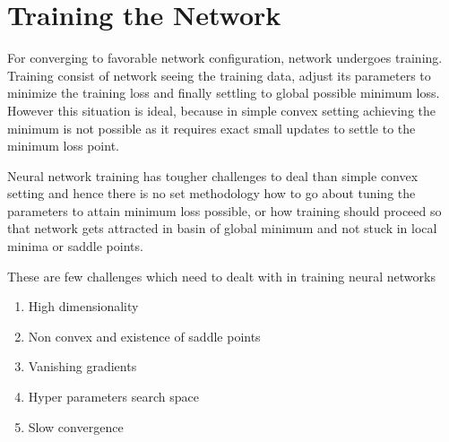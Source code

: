 

\chapter{Training the Network}\label{chap:training}

For converging to favorable network configuration, network undergoes training. Training consist of network seeing the training data, adjust its parameters to minimize the training loss and finally settling to global possible minimum loss. However this situation is ideal, because in simple convex setting achieving the minimum is not possible as it requires exact small updates to settle to the minimum loss point.

Neural network training has tougher challenges to deal than simple convex setting and hence there is no set methodology how to go about tuning the parameters to attain minimum loss possible, or how training should proceed so that network gets attracted in basin of global minimum and not stuck in local minima or saddle points.

These are few challenges which need to dealt with in training neural networks
\begin{enumerate}
	\item High dimensionality
	\item Non convex and existence of saddle points
	\item Vanishing gradients
    \item Hyper parameters search space
    \item Slow convergence
\end{enumerate}
